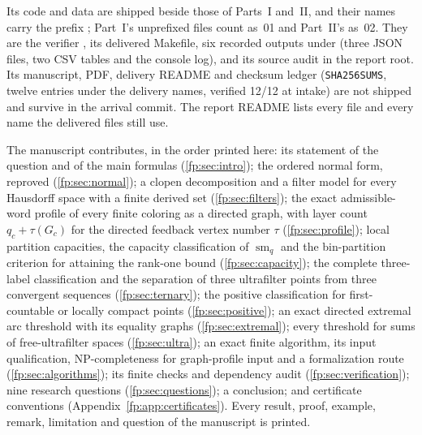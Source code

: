 \documentclass[11pt,letterpaper]{article}
\numberwithin{equation}{section}
\theoremstyle{definition}
\theoremstyle{remark}
\theoremstyle{definition}
\newcommand{\sm}{\operatorname{sm}}
\begin{document}
\begin{sloppypar}
Its code and data are shipped beside those of Parts~I and~II, and their
names carry the prefix ; Part~I's unprefixed files
count as~01 and Part~II's as~02. They are the verifier
, its delivered Makefile, six recorded
outputs under  (three JSON files, two CSV tables and the console
log), and its source audit  in the report
root. Its manuscript, PDF, delivery README and checksum ledger
(\texttt{SHA256SUMS}, twelve entries under the delivery names, verified 12/12
at intake) are not shipped and survive in the arrival commit. The report
README lists every file and every name the delivered files still use.
\end{sloppypar}

The manuscript contributes, in the order printed here: its statement of the
question and of the main formulas (\cref{fp:sec:intro}); the ordered normal
form, reproved (\cref{fp:sec:normal}); a clopen decomposition and a filter
model for every Hausdorff space with a finite derived set
(\cref{fp:sec:filters}); the exact admissible-word profile of every finite
coloring as a directed graph, with layer count $q_c+\tau(G_c)$ for the
directed feedback vertex number $\tau$ (\cref{fp:sec:profile}); local
partition capacities, the capacity classification of $\sm_q$ and the
bin-partition criterion for attaining the rank-one bound
(\cref{fp:sec:capacity}); the complete three-label classification and the
separation of three ultrafilter points from three convergent sequences
(\cref{fp:sec:ternary}); the positive classification for first-countable or
locally compact points (\cref{fp:sec:positive}); an exact directed extremal
arc threshold with its equality graphs (\cref{fp:sec:extremal}); every
threshold for sums of free-ultrafilter spaces (\cref{fp:sec:ultra}); an exact
finite algorithm, its input qualification, NP-completeness for graph-profile
input and a formalization route (\cref{fp:sec:algorithms}); its finite checks
and dependency audit (\cref{fp:sec:verification}); nine research questions
(\cref{fp:sec:questions}); a conclusion; and certificate conventions
(Appendix~\ref{fp:app:certificates}). Every result, proof, example, remark,
limitation and question of the manuscript is printed.
\end{document}
